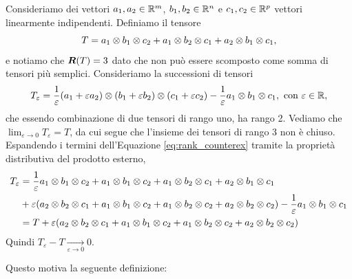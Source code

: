 \begin{example}
	\label{ex:border_rank}
	Consideriamo dei vettori $ a_1,a_2 \in \mathbb{R}^m$, $b_1,b_2 \in \mathbb{R}^n$ e $c_1,c_2\in \mathbb{R}^p $ vettori
	linearmente indipendenti. Definiamo il tensore
	\begin{equation}
		T = a_1 \otimes  b_1 \otimes c_2 + a_1 \otimes b_2 \otimes c_1 + a_2 \otimes b_1 \otimes c_1,
	\end{equation}
	e notiamo che $ \bm{R}(T) = 3 $ dato che non può
	essere scomposto come somma di tensori più semplici.
	Consideriamo la successioni di tensori
	\begin{equation}
		\label{eq:rank_counterex}
		T_\varepsilon = \frac{1}{\varepsilon}\left( a_1 +
		\varepsilon a_2 \right) \topp (b_1 + \varepsilon b_2) \topp (c_1 + \varepsilon c_2) -
		\frac{1}{\varepsilon} a_1 \topp b_1 \topp c_1, \text{ con } \varepsilon \in \R,
	\end{equation}
	che essendo combinazione di due tensori di rango uno, ha rango 2.
	Vediamo che $ \lim_{\varepsilon \to 0} T_\varepsilon = T $, da cui segue che l'insieme dei tensori di rango 3 non è chiuso.
	Espandendo i termini dell'Equazione \eqref{eq:rank_counterex} tramite la proprietà distributiva del prodotto esterno,
	\begin{equation}
		\begin{aligned}
			T_\varepsilon & =  \frac{1}{\varepsilon} a_1 \topp b_1 \topp c_2 + a_1 \topp b_1 \topp c_2 + a_1 \topp b_2 \topp c_1
			+a_2 \topp b_1 \topp c_1                                                                                             \\ &+ \varepsilon \left(a_2 \topp b_2 \topp c_1 + a_1 \topp b_1 \topp c_2 +
			a_1 \topp b_2 \topp c_2 + a_2 \topp b_2 \topp c_2 \right) - \frac{1}{\varepsilon} a_1 \topp
			b_1 \topp c_1                                                                                                        \\
			              & = T + \varepsilon\left(a_2 \topp b_2 \topp c_1 + a_1 \topp b_1 \topp c_2 +
			a_1 \topp b_2 \topp c_2 + a_2 \topp b_2 \topp c_2 \right)
		\end{aligned}
	\end{equation}
	Quindi $ T_\varepsilon - T \xrightarrow[\varepsilon \to 0]{}  0 $.
\end{example}

Questo motiva la seguente definizione:


